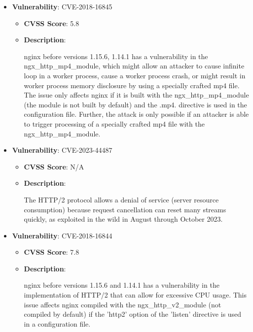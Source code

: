 \documentclass{article}
\begin{document}
\begin{itemize}
        \item \textbf{Vulnerability}: CVE-2018-16845
        \begin{itemize}
            \item \textbf{CVSS Score}:  5.8 
            \item \textbf{Description}:
            \parbox[t]{0.9\linewidth}{
                \ttfamily nginx before versions 1.15.6, 1.14.1 has a vulnerability in the ngx\_http\_mp4\_module, which might allow an attacker to cause infinite loop in a worker process, cause a worker process crash, or might result in worker process memory disclosure by using a specially crafted mp4 file. The issue only affects nginx if it is built with the ngx\_http\_mp4\_module (the module is not built by default) and the .mp4. directive is used in the configuration file. Further, the attack is only possible if an attacker is able to trigger processing of a specially crafted mp4 file with the ngx\_http\_mp4\_module.
            }
        \end{itemize}
    
        \item \textbf{Vulnerability}: CVE-2023-44487
        \begin{itemize}
            \item \textbf{CVSS Score}:  N/A 
            \item \textbf{Description}:
            \parbox[t]{0.9\linewidth}{
                \ttfamily The HTTP/2 protocol allows a denial of service (server resource consumption) because request cancellation can reset many streams quickly, as exploited in the wild in August through October 2023.
            }
        \end{itemize}
    
        \item \textbf{Vulnerability}: CVE-2018-16844
        \begin{itemize}
            \item \textbf{CVSS Score}:  7.8 
            \item \textbf{Description}:
            \parbox[t]{0.9\linewidth}{
                \ttfamily nginx before versions 1.15.6 and 1.14.1 has a vulnerability in the implementation of HTTP/2 that can allow for excessive CPU usage. This issue affects nginx compiled with the ngx\_http\_v2\_module (not compiled by default) if the 'http2' option of the 'listen' directive is used in a configuration file.
            }
        \end{itemize}
    

\end{itemize}
\end{document}
